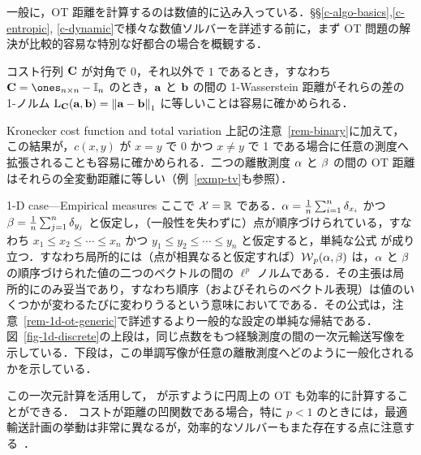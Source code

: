 一般に，OT 距離を計算するのは数値的に込み入っている．\S\S \ref{c-algo-basics},\ref{c-entropic}, \ref{c-dynamic}で様々な数値ソルバーを詳述する前に，まず OT 問題の解決が比較的容易な特別な好都合の場合を概観する．


\begin{rem}\label{rem-binary}
コスト行列 $\mathrm{\textbf{C}}$ が対角で 0，それ以外で $1$ であるとき，すなわち $\C=\ones_{n\times n}-\Identity_n$ のとき，$\mathrm{\textbf{a}}$ と $\mathrm{\textbf{b}}$ の間の 1-Wasserstein 距離がそれらの差の 1-ノルム $\mathrm{L}_{\mathrm{\textbf{C}}}(\mathrm{\textbf{a}},\mathrm{\textbf{b}})=\left\| \mathrm{\textbf{a}}-\mathrm{\textbf{b}} \right\|_1$ に等しいことは容易に確かめられる．
\end{rem}

\begin{rem1}{Kronecker cost function and total variation}
上記の注意~\ref{rem-binary}に加えて，この結果が，$c(x,y)$ が $x=y$ で $0$ かつ $x\ne y$ で 1 である場合に任意の測度へ拡張されることも容易に確かめられる．二つの離散測度 $\alpha$ と $\beta$ の間の OT 距離はそれらの全変動距離に等しい（例~\ref{exmp-tv}も参照）．
\end{rem1}



\begin{rem1}{1-D case---Empirical measures}\label{rem-1d-empir}
ここで $\mathcal{X}=\mathbb{R}$ である．$\alpha = \frac{1}{n}\sum_{i=1}^n \delta_{x_i}$ かつ $\beta = \frac{1}{n}\sum_{j=1}^n \delta_{y_j}$ と仮定し，（一般性を失わずに）点が順序づけられている，すなわち $x_1 \leq x_2 \leq \cdots \leq x_n$ かつ $y_1 \leq y_2 \leq \cdots \leq y_n$ と仮定すると，単純な公式
が成り立つ．すなわち局所的には（点が相異なると仮定すれば）$\operatorname{\mathcal{W}}_p(\alpha,\beta)$ は，$\alpha$ と $\beta$ の順序づけられた値の二つのベクトルの間の $\ell^p$ ノルムである．その主張は局所的にのみ妥当であり，すなわち順序（およびそれらのベクトル表現）は値のいくつかが変わるたびに変わりうるという意味においてである．その公式は，注意~\ref{rem-1d-ot-generic}で詳述するより一般的な設定の単純な帰結である．
%
図~\ref{fig-1d-discrete}の上段は，同じ点数をもつ経験測度の間の一次元輸送写像を示している．下段は，この単調写像が任意の離散測度へどのように一般化されるかを示している．


この一次元計算を活用して，\citet{delon-circle} が示すように円周上の OT も効率的に計算することができる．
%
コストが距離の凹関数である場合，特に $p<1$ のときには，最適輸送計画の挙動は非常に異なるが，効率的なソルバーもまた存在する点に注意する~\citep{delon-concave}．
\end{rem1}


